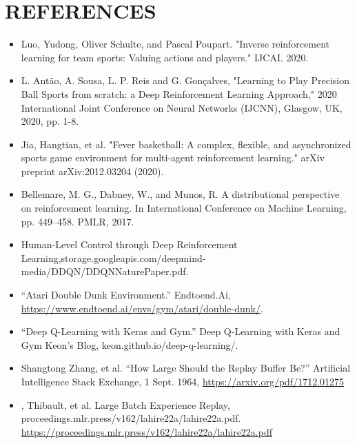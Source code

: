 \documentclass[letterpaper, 10 pt, conference]{ieeeconf}
\begin{document}
\section{\textbf{REFERENCES}}
\vspace{.5cm}
\begin{itemize}
    \item Luo, Yudong, Oliver Schulte, and Pascal Poupart. "Inverse reinforcement learning for team sports: Valuing actions and players." IJCAI. 2020. \\

    \item L. Antão, A. Sousa, L. P. Reis and G. Gonçalves, "Learning to Play Precision Ball Sports from scratch: a Deep Reinforcement Learning Approach," 2020 International Joint Conference on Neural Networks (IJCNN), Glasgow, UK, 2020, pp. 1-8. \\

    \item Jia, Hangtian, et al. "Fever basketball: A complex, flexible, and asynchronized sports game environment for multi-agent reinforcement learning." arXiv preprint arXiv:2012.03204 (2020). \\

    \item Bellemare, M. G., Dabney, W., and Munos, R. A distributional perspective on reinforcement learning. In International Conference on Machine Learning, pp. 449–458.
    PMLR, 2017.

    \item Human-Level Control through Deep Reinforcement Learning,storage.googleapis.com/deepmind-media/DDQN/DDQNNaturePaper.pdf.\\

    \item “Atari Double Dunk Environment.” Endtoend.Ai, 
    \url{https://www.endtoend.ai/envs/gym/atari/double-dunk/}.  \\

    \item “Deep Q-Learning with Keras and Gym.” Deep Q-Learning with Keras and Gym Keon’s Blog, keon.github.io/deep-q-learning/.\\

    \item Shangtong Zhang, et al. “How Large Should the Replay Buffer Be?” Artificial Intelligence Stack Exchange, 1 Sept. 1964, \url{https://arxiv.org/pdf/1712.01275} \\

    \item \Lahire, Thibault, et al. Large Batch Experience Replay, proceedings.mlr.press/v162/lahire22a/lahire22a.pdf. \url{https://proceedings.mlr.press/v162/lahire22a/lahire22a.pdf} \\


\end{itemize}
\end{document}
